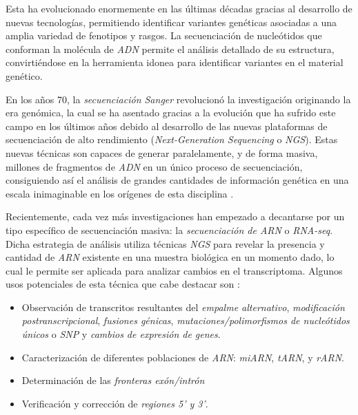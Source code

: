 \documentclass[IB,BIB]{TFUOC}%
\begin{document}
Esta ha evolucionado enormemente en las últimas décadas gracias al desarrollo de nuevas tecnologías, permitiendo identificar variantes genéticas asociadas a una amplia variedad de fenotipos y rasgos. La secuenciación de nucleótidos que conforman la molécula de \textit{ADN} permite el análisis detallado de su estructura, convirtiéndose en la herramienta idonea para identificar variantes en el material genético.

En los años 70, la \textit{secuenciación Sanger} revolucionó la investigación originando la era genómica, la cual se ha asentado gracias a la evolución que ha sufrido este campo en los últimos años debido al desarrollo de las nuevas plataformas de secuenciación de alto rendimiento (\textit{Next-Generation Sequencing} o \textit{NGS}). Estas nuevas técnicas son capaces de generar paralelamente, y de forma masiva, millones de fragmentos de \textit{ADN} en un único proceso de secuenciación, consiguiendo así el análisis de grandes cantidades de información genética en una escala inimaginable en los orígenes de esta disciplina \cite{behjati_what_2013,noauthor_next-generation_nodate}.

Recientemente, cada vez más investigaciones han empezado a decantarse por un tipo específico de secuenciación masiva: la \textit{secuenciación de ARN} o \textit{RNA-seq}. Dicha estrategia de análisis utiliza técnicas \textit{NGS} para revelar la presencia y cantidad de \textit{ARN} existente en una muestra biológica en un momento dado, lo cual le permite ser aplicada para analizar cambios en el transcriptoma. Algunos usos potenciales de esta técnica que cabe destacar son \cite{wang_rna-seq_2009} \cite{noauthor_rna-seq_2023}:

\footnotesize

\begin{itemize}
    \item Observación de transcritos resultantes del \textit{empalme alternativo}, \textit{modificación postranscripcional}, \textit{fusiones génicas}, \textit{mutaciones/polimorfismos de nucleótidos únicos} o \textit{SNP} y \textit{cambios de expresión de genes}.
    \item Caracterización de diferentes poblaciones de \textit{ARN}: \textit{miARN}, \textit{tARN}, y \textit{rARN}.
    \item Determinación de las \textit{fronteras exón/intrón}
    \item Verificación y corrección de \textit{regiones 5' y 3'}.
\end{itemize}
\end{document}
